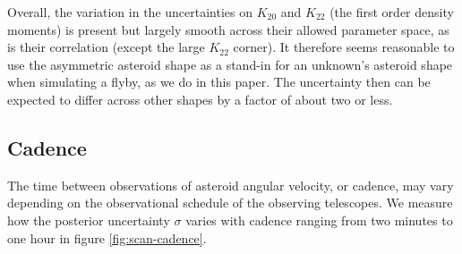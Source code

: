 \documentclass[fleqn,usenatbib]{mnras}
\begin{document}
Overall, the variation in the uncertainties on $K_{20}$ and $K_{22}$ (the first order density moments) is present but largely smooth across their allowed parameter space, as is their correlation (except the large $K_{22}$ corner). It therefore seems reasonable to use the asymmetric asteroid shape as a stand-in for an unknown's asteroid shape when simulating a flyby, as we do in this paper. The uncertainty then can be expected to differ across other shapes by a factor of about two or less.



\subsection{Cadence}
\label{sec:scan-cadence}

The time between observations of asteroid angular velocity, or cadence, may vary depending on the observational schedule of the observing telescopes. We measure how the posterior uncertainty $\sigma$ varies with cadence ranging from two minutes to one hour in figure \ref{fig:scan-cadence}.
\end{document}
